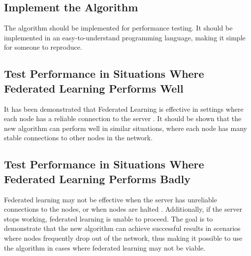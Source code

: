 \subsection{Implement the Algorithm}
The algorithm should be implemented for performance testing. It should be implemented in an easy-to-understand programming language, making it simple for someone to reproduce.

\subsection{Test Performance in Situations Where Federated Learning Performs Well}
It has been demonstrated that Federated Learning is effective in settings where each node has a reliable connection to the server \citeme. It should be shown that the new algorithm can perform well in similar situations, where each node has many stable connections to other nodes in the network.

\subsection{Test Performance in Situations Where Federated Learning Performs Badly}
Federated learning may not be effective when the server has unreliable connections to the nodes, or when nodes are halted \citeme. Additionally, if the server stops working, federated learning is unable to proceed. The goal is to demonstrate that the new algorithm can achieve successful results in scenarios where nodes frequently drop out of the network, thus making it possible to use the algorithm in cases where federated learning may not be viable.